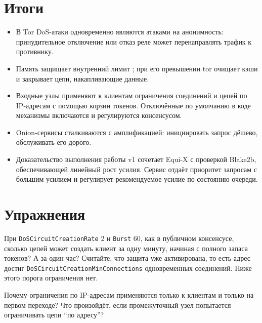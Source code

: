 \section*{Итоги}
\begin{itemize}
  \item В Tor DoS-атаки одновременно являются атаками на анонимность: принудительное отключение или отказ реле может перенаправлять трафик к противнику.
  \item Память защищает внутренний лимит ; при его превышении tor очищает кэши и закрывает цепи, накапливающие данные.
  \item Входные узлы применяют к клиентам ограничения соединений и цепей по IP-адресам с помощью корзин токенов. Отключённые по умолчанию в коде механизмы включаются и регулируются консенсусом.
  \item Onion-сервисы сталкиваются с амплификацией: инициировать запрос дёшево, обслуживать его дорого.
  \item Доказательство выполнения работы v1 сочетает Equi-X с проверкой Blake2b, обеспечивающей линейный рост усилия. Сервис отдаёт приоритет запросам с большим усилием и регулирует рекомендуемое усилие по состоянию очереди.
\end{itemize}

\section*{Упражнения}

\begin{esercizio}[1]\label{es:15-bucket}
При \texttt{DoSCircuitCreationRate} 2 и \texttt{Burst} 60, как в публичном консенсусе, сколько цепей может создать клиент за одну минуту, начиная с полного запаса токенов? А за один час? Считайте, что защита уже активирована, то есть адрес достиг \texttt{DoSCircuitCreationMinConnections} одновременных соединений. Ниже этого порога ограничения нет.
\end{esercizio}

\begin{esercizio}[1]\label{es:15-guard}
Почему ограничения по IP-адресам применяются только к клиентам и только на первом переходе? Что произойдёт, если промежуточный узел попытается ограничивать цепи \enquote{по адресу}?
\end{esercizio}

